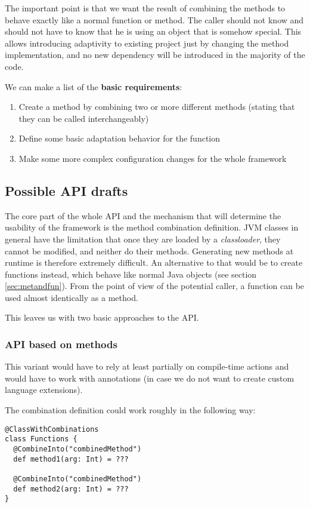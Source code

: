 The important point is that we want the result of combining the methods to behave exactly like a normal function or method. The caller should not know and should not have to know that he is using an object that is somehow special. This allows introducing adaptivity to existing project just by changing the method implementation, and no new dependency will be introduced in the majority of the code.

We can make a list of the \textbf{basic requirements}:
\begin{enumerate}
	\item Create a method by combining two or more different methods (stating that they can be called interchangeably)
	\item Define some basic adaptation behavior for the function
	\item Make some more complex configuration changes for the whole framework
\end{enumerate}

\subsection{Possible API drafts}
\label{subsec:api_drafts}

The core part of the whole API and the mechanism that will determine the usability of the framework is the method combination definition. JVM classes in general have the limitation that once they are loaded by a \textit{classloader}, they cannot be modified, and neither do their methods. Generating new methods at runtime is therefore extremely difficult. An alternative to that would be to create functions instead, which behave like normal Java objects (see section \ref{sec:metandfun}). From the point of view of the potential caller, a function can be used almost identically as a method. 

This leaves us with two basic approaches to the API.

\subsubsection{API based on methods}

This variant would have to rely at least partially on compile-time actions and would have to work with annotations (in case we do not want to create custom language extensions).

The combination definition could work roughly in the following way:
\lstset{style=Scala}
\begin{lstlisting}
@ClassWithCombinations
class Functions {
  @CombineInto("combinedMethod")
  def method1(arg: Int) = ???
  
  @CombineInto("combinedMethod")
  def method2(arg: Int) = ???
}
\end{lstlisting}

